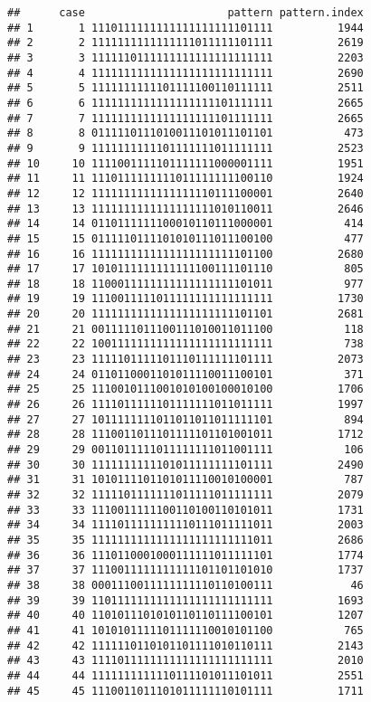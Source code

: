 \documentclass[]{article}
\begin{document}
\begin{verbatim}
##      case                      pattern pattern.index
## 1       1 1110111111111111111111101111          1944
## 2       2 1111111111111111011111101111          2619
## 3       3 1111110111111111111111111111          2203
## 4       4 1111111111111111111111111111          2690
## 5       5 1111111111101111100110111111          2511
## 6       6 1111111111111111111101111111          2665
## 7       7 1111111111111111111101111111          2665
## 8       8 0111110111010011101011101101           473
## 9       9 1111111111101111111011111111          2523
## 10     10 1111001111101111111000001111          1951
## 11     11 1110111111111011111111100110          1924
## 12     12 1111111111111111110111100001          2640
## 13     13 1111111111111111111010110011          2646
## 14     14 0110111111100010110111000001           414
## 15     15 0111110111101010111011100100           477
## 16     16 1111111111111111111111101100          2680
## 17     17 1010111111111111100111101110           805
## 18     18 1100011111111111111111101011           977
## 19     19 1110011111011111111111111111          1730
## 20     20 1111111111111111111111101101          2681
## 21     21 0011111011100111010011011100           118
## 22     22 1001111111111111111111111111           738
## 23     23 1111101111101110111111101111          2073
## 24     24 0110110001101011110011100101           371
## 25     25 1110010111001010100100010100          1706
## 26     26 1111011111101111111011011111          1997
## 27     27 1011111111011011011011111101           894
## 28     28 1110011011101111101101001011          1712
## 29     29 0011011111011111111011001111           106
## 30     30 1111111111101011111111101111          2490
## 31     31 1010111101101011110010100001           787
## 32     32 1111101111111011111011111111          2079
## 33     33 1110011111100110100110101011          1731
## 34     34 1111011111111110111011111011          2003
## 35     35 1111111111111111111111111011          2686
## 36     36 1110110001000111111011111101          1774
## 37     37 1110011111111111101101101010          1737
## 38     38 0001110011111111110110100111            46
## 39     39 1101111111111111111111111111          1693
## 40     40 1101011101010110110111100101          1207
## 41     41 1010101111101111110010101100           765
## 42     42 1111110110101101111010110111          2143
## 43     43 1111011111111111111111111111          2010
## 44     44 1111111111110111101011101011          2551
## 45     45 1110011011101011111110101111          1711

\end{verbatim}
\end{document}
